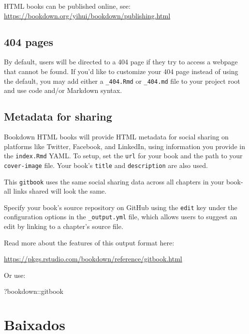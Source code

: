 \documentclass[
]{book}
\newenvironment{Shaded}{\begin{snugshade}}{\end{snugshade}}
\newcommand{\NormalTok}[1]{#1}
\newcommand{\SpecialCharTok}[1]{\textcolor[rgb]{0.00,0.00,0.00}{#1}}
\theoremstyle{definition}
\theoremstyle{definition}
\theoremstyle{definition}
\theoremstyle{definition}
\theoremstyle{remark}
\begin{document}
HTML books can be published online, see: \url{https://bookdown.org/yihui/bookdown/publishing.html}

\hypertarget{pages-3}{%
\section{404 pages}\label{pages-3}}

By default, users will be directed to a 404 page if they try to access a webpage that cannot be found. If you'd like to customize your 404 page instead of using the default, you may add either a \texttt{\_404.Rmd} or \texttt{\_404.md} file to your project root and use code and/or Markdown syntax.

\hypertarget{metadata-for-sharing-3}{%
\section{Metadata for sharing}\label{metadata-for-sharing-3}}

Bookdown HTML books will provide HTML metadata for social sharing on platforms like Twitter, Facebook, and LinkedIn, using information you provide in the \texttt{index.Rmd} YAML. To setup, set the \texttt{url} for your book and the path to your \texttt{cover-image} file. Your book's \texttt{title} and \texttt{description} are also used.

This \texttt{gitbook} uses the same social sharing data across all chapters in your book- all links shared will look the same.

Specify your book's source repository on GitHub using the \texttt{edit} key under the configuration options in the \texttt{\_output.yml} file, which allows users to suggest an edit by linking to a chapter's source file.

Read more about the features of this output format here:

\url{https://pkgs.rstudio.com/bookdown/reference/gitbook.html}

Or use:

\begin{Shaded}
\begin{Highlighting}[]
\NormalTok{?bookdown}\SpecialCharTok{::}\NormalTok{gitbook}
\end{Highlighting}
\end{Shaded}

\hypertarget{baixados}{%
\chapter{Baixados}\label{baixados}}
\end{document}

